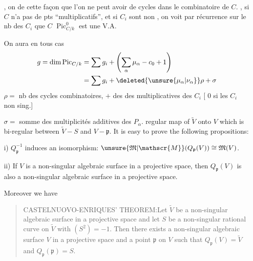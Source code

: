  , on  de cette façon que l'on ne peut avoir de cycles
dans le  combinatoire de $C$.  , si $C$ n'a pas de pts   ``multiplicatifs'', et si  $C_i$ sont non , on voit par récurrence sur le nb des $C_i$ que $C$  $\operatorname{Pic}^{0}_{C/k}$ est une V.A.

On aura en tous cas
\[
\begin{aligned}
g=\dim\operatorname{Pic}_{C/k}&=\sum g_i+\left(\sum_{\alpha}\mu_{\alpha}-c_{0}+1\right)\\
 &=\sum g_i+\deleted{\unsure{\mu_{\alpha}|\nu_{\alpha}}}\rho+\sigma
\end{aligned}
\]
$\rho=$ nb des cycles combinatoires, $+$  des  des  multiplicatives des $C_i$ [  $0$ si les $C_i$ non sing.]

$\sigma=$ somme des multiplicités additives des $P_{\alpha}$.
regular map of $\widetilde{V}$ onto $V$ which is bi-regular between $\widetilde{V}-S$ and $V-\mathfrak{p}$. It is easy to prove the following propositions:\footnotemark[4]

i) $Q_{\mathfrak{p}}^{-1}$ induces an isomorphism: $\unsure{\mathfrak{M}|\mathscr{M}}(Q_{\mathfrak{p}}(V))\cong\mathfrak{M}(V)$.

ii) If $V$ is a non-singular algebraic surface in a projective space, then $Q_{\mathfrak{p}}(V)$ is also a non-singular algebraic surface in a projective space.

Moreover we have

\begin{quote}
CASTELNUOVO-ENRIQUES' THEOREM:\footnotemark[5] Let $\widetilde{V}$ be a non-singular algebraic surface in a projective space and let $S$ be a non-singular rational curve on $\widetilde{V}$ with $(S^{2})=-1$. Then there exists a non-singular algebraic surface $V$ in a projective space and a point $\mathfrak{p}$ on $V$ such that $Q_{\mathfrak{p}}(V)=\widetilde{V}$ and $Q_{\mathfrak{p}}(\mathfrak{p})=S$.
\end{quote}

